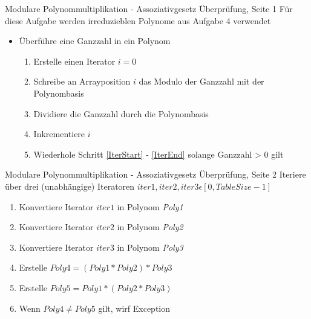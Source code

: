 \documentclass{beamer}
\begin{document}
    \begin{frame}{Modulare Polynommultiplikation - \newline Assoziativgesetz Überprüfung, Seite 1}
	    Für diese Aufgabe werden irreduzieblen Polynome aus Aufgabe 4 verwendet
    	\begin{itemize}
  	  	\item Überführe eine Ganzzahl in ein Polynom
  	  	\begin{enumerate}
	  	  	\item Erstelle einen Iterator $i = 0$
	  	  	\item Schreibe an Arrayposition $i$ das Modulo der Ganzzahl mit der Polynombasis \label{IterStart}
	  	  	\item Dividiere die Ganzzahl durch die Polynombasis
	  	  	\item Inkrementiere $i$ \label{IterEnd}
	  	  	\item Wiederhole Schritt \ref*{IterStart} - \ref*{IterEnd} solange Ganzzahl > 0 gilt
  	  	\end{enumerate}
  	  	\end{itemize}
    \end{frame}
    
    \begin{frame}{Modulare Polynommultiplikation - \newline Assoziativgesetz Überprüfung, Seite 2}
		Iteriere über drei (unabhängige) Iteratoren \newline  $iter1, iter2, iter3 \epsilon [0, TableSize - 1]$
      	\begin{enumerate}
	    	\item Konvertiere Iterator $iter1$ in Polynom \textit{Poly1}
	    	\item Konvertiere Iterator $iter2$ in Polynom \textit{Poly2}
	    	\item Konvertiere Iterator $iter3$ in Polynom \textit{Poly3}
	    	\item Erstelle $Poly4 = (Poly1 *  Poly2) * Poly3$
	    	\item Erstelle $Poly5 =  Poly1 * (Poly2  * Poly3)$
	    	\item Wenn $Poly4 \neq Poly5$ gilt, wirf Exception
      	\end{enumerate}
   \end{frame}
    
\end{document}
